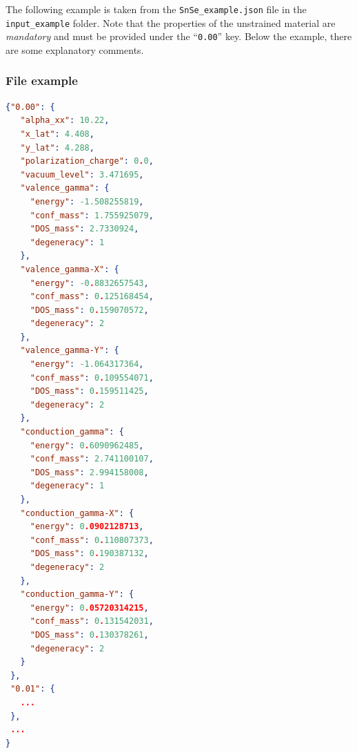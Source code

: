 \documentclass[a4paper,12pt]{article}
\begin{document}
The following example is taken from the \texttt{SnSe\_example.json} file in the \texttt{input\_example} folder. Note that the properties of the unstrained material are \emph{mandatory} and must be provided under the ``\texttt{0.00}'' key. Below the example, there are some explanatory comments.

\subsubsection*{File example}

\begin{lstlisting}[language=json,firstnumber=1]
{"0.00": {
   "alpha_xx": 10.22,
   "x_lat": 4.408,
   "y_lat": 4.288,
   "polarization_charge": 0.0,
   "vacuum_level": 3.471695,
   "valence_gamma": { 
     "energy": -1.508255819,
     "conf_mass": 1.755925079,
     "DOS_mass": 2.7330924,
     "degeneracy": 1
   },
   "valence_gamma-X": {
     "energy": -0.8832657543,
     "conf_mass": 0.125168454,
     "DOS_mass": 0.159070572,
     "degeneracy": 2
   },
   "valence_gamma-Y": {
     "energy": -1.064317364,
     "conf_mass": 0.109554071,
     "DOS_mass": 0.159511425,
     "degeneracy": 2
   },
   "conduction_gamma": {
     "energy": 0.6090962485,
     "conf_mass": 2.741100107,
     "DOS_mass": 2.994158008,
     "degeneracy": 1
   },
   "conduction_gamma-X": {
     "energy": 0.0902128713,
     "conf_mass": 0.110807373,
     "DOS_mass": 0.190387132,
     "degeneracy": 2
   },
   "conduction_gamma-Y": {
     "energy": 0.05720314215,
     "conf_mass": 0.131542031,
     "DOS_mass": 0.130378261,
     "degeneracy": 2
   }
 },
 "0.01": {
   ...
 },
 ...
}
\end{lstlisting}
\end{document}
